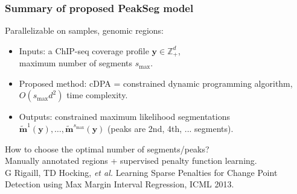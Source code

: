 \documentclass{beamer}
\newcommand{\ZZ}{\mathbb Z}
\begin{document}
\begin{frame}
  \frametitle{Summary of proposed PeakSeg model}
  Parallelizable on samples, genomic regions:
  \begin{itemize}
  \item Inputs: a ChIP-seq coverage profile $\mathbf y\in\ZZ_+^d$,\\
    maximum number of segments $s_{\text{max}}$.
  \item Proposed method: cDPA = constrained 
    dynamic programming
    algorithm,
    $O(s_{\text{max}} d^2)$ time complexity.
  \item Outputs: constrained maximum likelihood segmentations
    $\mathbf{\tilde m}^1(\mathbf y), 
    \dots, 
    \mathbf{\tilde m}^{s_\text{max}}(\mathbf y)$ 
    (peaks are 2nd, 4th, ... segments).
  \end{itemize}
  How to choose the optimal number of segments/peaks?\\
  Manually annotated regions + supervised penalty function learning.\\
  G Rigaill, TD Hocking, \emph{et al.} Learning Sparse Penalties for
  Change Point Detection using Max Margin Interval Regression, ICML
  2013.
\end{frame}

\end{document}

